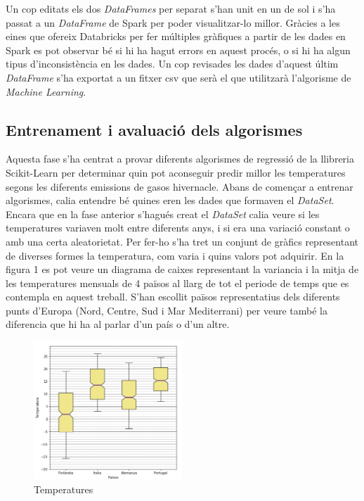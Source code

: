 \documentclass[10pt,a4paper,twocolumn,twoside]{article}
\begin{document}
Un cop editats els dos \textit{DataFrames} per separat s'han unit en un de sol i s'ha passat a un \textit{DataFrame} de Spark per poder visualitzar-lo millor. Gràcies a les eines que ofereix Databricks per fer múltiples gràfiques a partir de les dades en Spark es pot observar bé si hi ha hagut errors en aquest procés, o si hi ha algun tipus d'inconsistència en les dades. Un cop revisades les dades d'aquest últim \textit{DataFrame} s'ha exportat a un fitxer csv que serà el que utilitzarà l'algorisme de \textit{Machine Learning}.
\subsection{Entrenament i avaluació dels algorismes}
Aquesta fase s'ha centrat a provar diferents algorismes de regressió de la llibreria Scikit-Learn per determinar quin pot aconseguir predir millor les temperatures segons les diferents emissions de gasos hivernacle. Abans de començar a entrenar algorismes, calia entendre bé quines eren les dades que formaven el \textit{DataSet}. Encara que en la fase anterior s'hagués creat el \textit{DataSet} calia veure si les temperatures variaven molt entre diferents anys, i si era una variació constant o amb una certa aleatorietat. Per fer-ho s'ha tret un conjunt de gràfics representant de diverses formes la temperatura, com varia i quins valors pot adquirir. En la figura 1 es pot veure un diagrama de caixes representant la variancia i la mitja de les temperatures mensuals de 4 països al llarg de tot el periode de temps que es contempla en aquest treball. S'han escollit països representatius dels diferents punts d'Europa (Nord, Centre, Sud i Mar Mediterrani) per veure també la diferencia que hi ha al parlar d'un país o d'un altre.
\begin{figure}[!h]
\centering
	\includegraphics[width=0.5\textwidth]{../img/tempMitjaVariacioPaisos}
	\caption{Temperatures }
	\label{fig-tempMitjaPaisos}
\end{figure}
\end{document}
